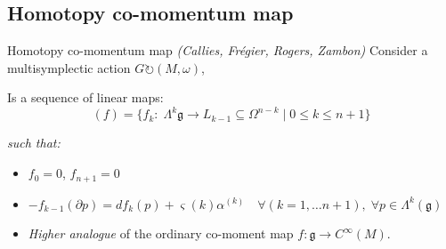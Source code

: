 \documentclass[handout,10pt]{beamer}
\begin{document}
  \subsection{Homotopy co-momentum map}
  \begin{frame}[fragile,t]{Homotopy co-momentum map \emph{(Callies, Frégier, Rogers, Zambon)}}
		Consider a multisymplectic action $G \circlearrowright (M, \omega)$,
		\begin{defblock}				
			Is a sequence of linear maps:
			\begin{displaymath}
				(f)  = \big\lbrace f_k: \; \Lambda^k{\mathfrak g} \to L_{k-1} \subseteq \Omega^{n-k} 
				\;\big\vert\; 0\leq k \leq n+1  \big\rbrace
			\end{displaymath}
						
			\emph{such that:}
			\begin{itemize}
				\item $f_0 = 0 $, $f_{n+1} = 0$ %
				\item<2-> $-f_{k-1} (\partial p) = d f_k (p) + \varsigma(k) \alpha^{(k)} \quad \forall (k=1,\dots n+1), \; \forall p \in \Lambda^k(\mathfrak{g})$
			\end{itemize}
		\end{defblock}
		\begin{itemize}
			\item \emph{Higher analogue} of the ordinary co-moment map $f\colon \mathfrak{g}\rightarrow C^\infty(M)$.
		\end{itemize}
  \end{frame}
\end{document}
